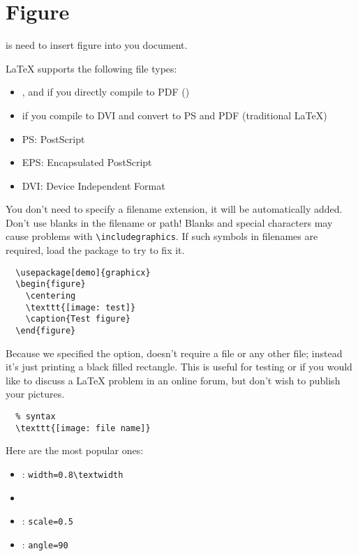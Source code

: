 \chapter{Figure}

 is need to insert figure into you document.


LaTeX supports the following file types:
\begin{itemize}
\item {}, and  if you directly compile
  to PDF ()
\item {} if you compile to DVI and convert to PS and PDF (traditional LaTeX)
\end{itemize}


\begin{tcolorbox}
  \begin{itemize}
  \item PS: PostScript
  \item EPS: Encapsulated PostScript
  \item DVI: Device Independent Format
  \end{itemize}
\end{tcolorbox}


You don't need to specify a filename extension, it will be
automatically added.
Don't use blanks in the filename or path!
Blanks and special characters may cause problems with \lstinline|\includegraphics|.
If such symbols in filenames are required, load the package
 to try to fix it.


\begin{lstlisting}
  \usepackage[demo]{graphicx}
  \begin{figure}
    \centering
    \texttt{[image: test]}
    \caption{Test figure}
  \end{figure}
\end{lstlisting}

Because we specified the  option, 
doesn't require a file  or any other file; instead
it's just printing a black filled rectangle. This is useful for
testing or if you would like to discuss a LaTeX problem in an online
forum, but don't wish to publish your pictures.


\begin{lstlisting}
  % syntax
  \texttt{[image: file name]}
\end{lstlisting}

Here are the most popular ones:
\begin{itemize}
\item {}: \lstinline|width=0.8\textwidth|
\item {}
\item {}: \lstinline|scale=0.5|
\item {}: \lstinline{angle=90}
\end{itemize}





